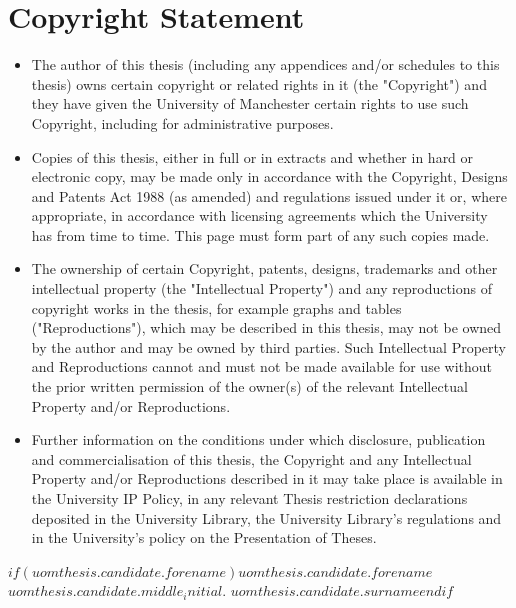 \chapter*{Copyright Statement}

\begin{itemize}
\item The author of this thesis (including any appendices and/or schedules to this thesis) owns certain copyright or related rights in it (the "Copyright") and they have given the University of Manchester certain rights to use such Copyright, including for administrative purposes.

\item Copies of this thesis, either in full or in extracts and whether in hard or electronic copy, may be made only in accordance with the Copyright, Designs and Patents Act 1988 (as amended) and regulations issued under it or, where appropriate, in accordance with licensing agreements which the University has from time to time. This page must form part of any such copies made.

\item The ownership of certain Copyright, patents, designs, trademarks and other intellectual property (the "Intellectual Property") and any reproductions of copyright works in the thesis, for example graphs and tables ("Reproductions"), which may be described in this thesis, may not be owned by the author and may be owned by third parties. Such Intellectual Property and Reproductions cannot and must not be made available for use without the prior written permission of the owner(s) of the relevant Intellectual Property and/or Reproductions.

\item Further information on the conditions under which disclosure, publication and commercialisation of this thesis, the Copyright and any Intellectual Property and/or Reproductions described in it may take place is available in the University IP Policy, in any relevant Thesis restriction declarations deposited in the University Library, the University Library's regulations and in the University's policy on the Presentation of Theses.
\end{itemize}

$if(uomthesis.candidate.forename)$$uomthesis.candidate.forename$ $uomthesis.candidate.middle_initial$. $uomthesis.candidate.surname$$endif$
